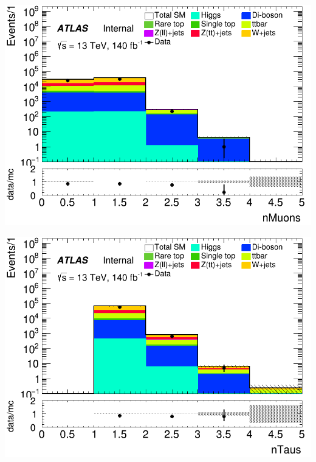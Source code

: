 \documentclass[usenames,dvipsnames]{beamer}
\begin{document}
\begin{frame}
    \begin{minipage}{0.32\textwidth}
        \centering
        \includegraphics[width=\textwidth]{graphics/LH_met/LH_met_nMuons.png}
    \end{minipage}
    \hfill
    \begin{minipage}{0.32\textwidth}
        \centering
        \includegraphics[width=\textwidth]{graphics/LH_met/LH_met_nTaus.png}
    \end{minipage}
    \hfill
    \begin{minipage}{0.32\textwidth}
        \centering

\end{minipage}
\end{frame}
\end{document}
